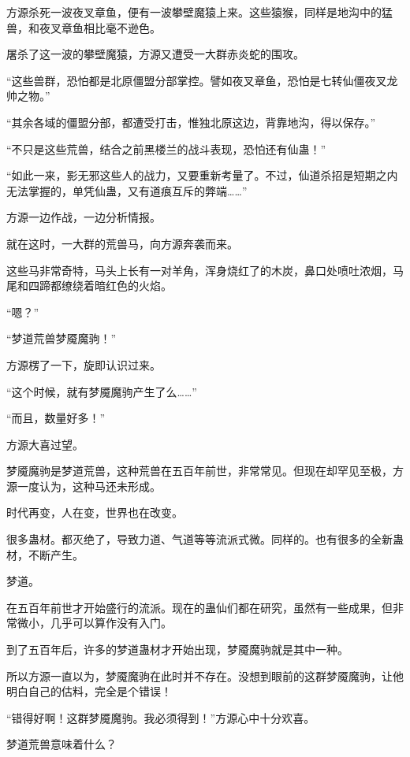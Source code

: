 
\begin{this_body}

方源杀死一波夜叉章鱼，便有一波攀壁魔猿上来。这些猿猴，同样是地沟中的猛兽，和夜叉章鱼相比毫不逊色。

屠杀了这一波的攀壁魔猿，方源又遭受一大群赤炎蛇的围攻。

“这些兽群，恐怕都是北原僵盟分部掌控。譬如夜叉章鱼，恐怕是七转仙僵夜叉龙帅之物。”

“其余各域的僵盟分部，都遭受打击，惟独北原这边，背靠地沟，得以保存。”

“不只是这些荒兽，结合之前黑楼兰的战斗表现，恐怕还有仙蛊！”

“如此一来，影无邪这些人的战力，又要重新考量了。不过，仙道杀招是短期之内无法掌握的，单凭仙蛊，又有道痕互斥的弊端……”

方源一边作战，一边分析情报。

就在这时，一大群的荒兽马，向方源奔袭而来。

这些马非常奇特，马头上长有一对羊角，浑身烧红了的木炭，鼻口处喷吐浓烟，马尾和四蹄都缭绕着暗红色的火焰。

“嗯？”

“梦道荒兽梦魇魔驹！”

方源楞了一下，旋即认识过来。

“这个时候，就有梦魇魔驹产生了么……”

“而且，数量好多！”

方源大喜过望。

梦魇魔驹是梦道荒兽，这种荒兽在五百年前世，非常常见。但现在却罕见至极，方源一度认为，这种马还未形成。

时代再变，人在变，世界也在改变。

很多蛊材。都灭绝了，导致力道、气道等等流派式微。同样的。也有很多的全新蛊材，不断产生。

梦道。

在五百年前世才开始盛行的流派。现在的蛊仙们都在研究，虽然有一些成果，但非常微小，几乎可以算作没有入门。

到了五百年后，许多的梦道蛊材才开始出现，梦魇魔驹就是其中一种。

所以方源一直以为，梦魇魔驹在此时并不存在。没想到眼前的这群梦魇魔驹，让他明白自己的估料，完全是个错误！

“错得好啊！这群梦魇魔驹。我必须得到！”方源心中十分欢喜。

梦道荒兽意味着什么？


\end{this_body}
